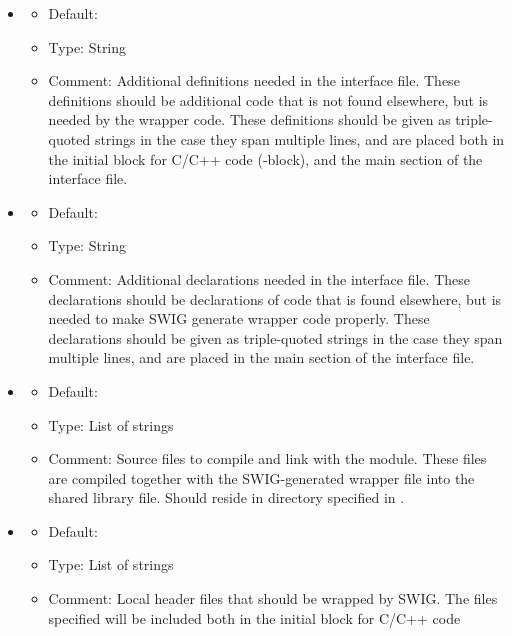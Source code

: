 \begin{itemize}
\item {}
  \begin{itemize}
    \item Default: 
    \item Type: String
    \item Comment: Additional definitions needed in the interface file. 
      These definitions should be additional code that is not found 
      elsewhere, but is needed by the wrapper code. 
      These definitions should be given as triple-quoted
      strings in the case they span multiple lines, and are placed both in the
      initial block for C/C++ code (\emp{\%\{,\%\}}-block), and the main section
      of the interface file.
  \end{itemize}
\item {}
  \begin{itemize}
    \item Default: 
    \item Type: String
    \item Comment: Additional declarations needed in the interface file. 
      These declarations should be declarations of code that is found 
      elsewhere, but is needed to make SWIG generate wrapper code properly. 
      These declarations should be given as triple-quoted
      strings in the case they span multiple lines, and are placed in the main
      section of the interface file.
  \end{itemize}
\item {}
  \begin{itemize}
    \item Default: \emp{[]}
    \item Type: List of strings
    \item Comment: Source files to compile and link with the module. These
      files are compiled together with the SWIG-generated wrapper file into
      the shared library file. Should reside in directory specified in
      .
  \end{itemize}
\item {}
  \begin{itemize}
    \item Default: \emp{[]}
    \item Type: List of strings
    \item Comment: Local header files that should be wrapped by SWIG. The
      files specified will be included both in the initial block for C/C++ code

\end{itemize}
\end{itemize}

